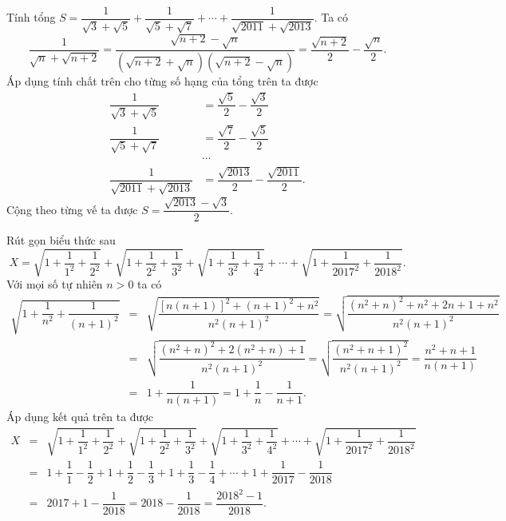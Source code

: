 \begin{bt}%
	Tính tổng $S = \dfrac{1}{\sqrt{3} + \sqrt{5}} + \dfrac{1}{\sqrt{5} + \sqrt{7}} + \cdots + \dfrac{1}{\sqrt{2011} + \sqrt{2013}}$.
	\loigiai
	{
		Ta có
		$$\dfrac{1}{\sqrt{n} + \sqrt{n+2}} = \dfrac{\sqrt{n+2} - \sqrt{n}}{\left( \sqrt{n+2} + \sqrt{n} \right) \left( \sqrt{n+2} - \sqrt{n} \right)} = \dfrac{\sqrt{n+2}}{2} - \dfrac{\sqrt{n}}{2}.$$
		Áp dụng tính chất trên cho từng số hạng của tổng trên ta được
		\allowdisplaybreaks
		\begin{align*}
		\dfrac{1}{\sqrt{3} + \sqrt{5}} & = \dfrac{\sqrt{5}}{2} - \dfrac{\sqrt{3}}{2} \\
		\dfrac{1}{\sqrt{5} + \sqrt{7}} & = \dfrac{\sqrt{7}}{2} - \dfrac{\sqrt{5}}{2} \\
		& \cdots \\
		\dfrac{1}{\sqrt{2011} + \sqrt{2013}} & = \dfrac{\sqrt{2013}}{2} - \dfrac{\sqrt{2011}}{2}.
		\end{align*}
		Cộng theo từng vế ta được $S = \dfrac{\sqrt{2013} - \sqrt{3}}{2}$.
	}
\end{bt}

\begin{bt}%
	Rút gọn biểu thức sau
	$$X = \sqrt{1+\dfrac{1}{1^2}+\dfrac{1}{2^2}} + \sqrt{1+\dfrac{1}{2^2}+\dfrac{1}{3^2}} + \sqrt{1+\dfrac{1}{3^2}+\dfrac{1}{4^2}} + \cdots + \sqrt{1+\dfrac{1}{2017^2}+\dfrac{1}{2018^2}}.$$
	\loigiai
	{
		Với mọi số tự nhiên $n > 0$ ta có
		\allowdisplaybreaks
		\begin{eqnarray*}
			\sqrt{1 + \dfrac{1}{n^2} + \dfrac{1}{(n+1)^2}} &=& \sqrt{\dfrac{\left[n(n+1)\right]^2 + (n+1)^2 + n^2}{n^2(n+1)^2}} = \sqrt{\dfrac{(n^2+n)^2 + n^2+2n+1 + n^2}{n^2(n+1)^2}}\\
			&=& \sqrt{\dfrac{(n^2+n)^2 + 2(n^2+n) + 1}{n^2(n+1)^2}} = \sqrt{\dfrac{(n^2+n+1)^2}{n^2(n+1)^2}} = \dfrac{n^2+n+1}{n(n+1)}\\
			&=& 1 + \dfrac{1}{n(n+1)} = 1 + \dfrac{1}{n} - \dfrac{1}{n+1}.
		\end{eqnarray*}
		Áp dụng kết quả trên ta được
		\allowdisplaybreaks
		\begin{eqnarray*}
			X &=& \sqrt{1+\dfrac{1}{1^2}+\dfrac{1}{2^2}} + \sqrt{1+\dfrac{1}{2^2}+\dfrac{1}{3^2}} + \sqrt{1+\dfrac{1}{3^2}+\dfrac{1}{4^2}} + \cdots + \sqrt{1+\dfrac{1}{2017^2}+\dfrac{1}{2018^2}}\\
			&=& 1 + \dfrac{1}{1} - \dfrac{1}{2} + 1 + \dfrac{1}{2} - \dfrac{1}{3} + 1 + \dfrac{1}{3} - \dfrac{1}{4} + \cdots + 1 + \dfrac{1}{2017} - \dfrac{1}{2018}\\
			&=& 2017 + 1 - \dfrac{1}{2018} = 2018 - \dfrac{1}{2018} = \dfrac{2018^2 - 1}{2018}.
		\end{eqnarray*}
	}
\end{bt}

